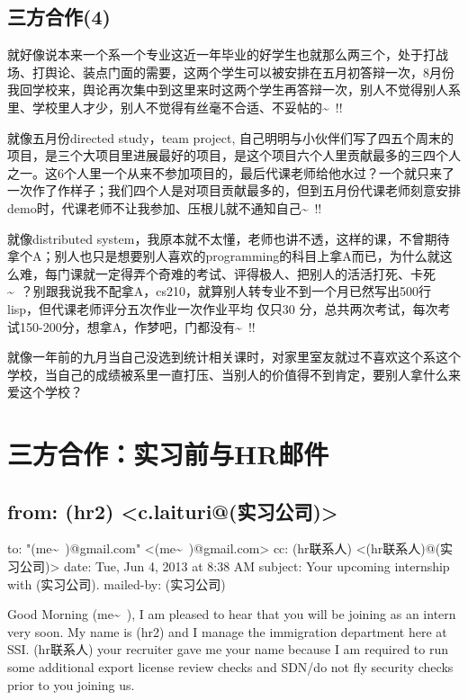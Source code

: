 \documentclass[12pt]{book}
\begin{document}
\section{三方合作(4)}
\label{sec-38-4}

就好像说本来一个系一个专业这近一年毕业的好学生也就那么两三个，处于打战场、打舆论、装点门面的需要，这两个学生可以被安排在五月初答辩一次，8月份我回学校来，舆论再次集中到这里来时这两个学生再答辩一次，别人不觉得别人系里、学校里人才少，别人不觉得有丝毫不合适、不妥帖的\textasciitilde{}~!!

就像五月份directed study，team project, 自己明明与小伙伴们写了四五个周末的项目，是三个大项目里进展最好的项目，是这个项目六个人里贡献最多的三四个人之一。这6个人里一个从来不参加项目的，最后代课老师给他水过？一个就只来了一次作了作样子；我们四个人是对项目贡献最多的，但到五月份代课老师刻意安排demo时，代课老师不让我参加、压根儿就不通知自己\textasciitilde{}~!! 

就像distributed system，我原本就不太懂，老师也讲不透，这样的课，不曾期待拿个A；别人也只是想要别人喜欢的programming的科目上拿A而已，为什么就这么难，每门课就一定得弄个奇难的考试、评得极人、把别人的活活打死、卡死\textasciitilde{}~？别跟我说我不配拿A，cs210，就算别人转专业不到一个月已然写出500行lisp，但代课老师评分五次作业一次作业平均 仅只30 分，总共两次考试，每次考试150-200分，想拿A，作梦吧，门都没有\textasciitilde{}~!!

就像一年前的九月当自己没选到统计相关课时，对家里室友就过不喜欢这个系这个学校，当自己的成绩被系里一直打压、当别人的价值得不到肯定，要别人拿什么来爱这个学校？

\chapter{三方合作：实习前与HR邮件}
\label{sec-39}

\section{from:         (hr2) <c.laituri@(实习公司)>}
\label{sec-39-1}
to:         "(me\textasciitilde{}~)@gmail.com" <(me\textasciitilde{}~)@gmail.com>
cc:         (hr联系人) <(hr联系人)@(实习公司)>
date:         Tue, Jun 4, 2013 at 8:38 AM
subject:         Your upcoming internship with (实习公司).
mailed-by:         (实习公司)

Good Morning (me\textasciitilde{}~),
I am pleased to hear that you will be joining as an intern very soon.  My name is (hr2) and I manage the immigration department here at SSI.  (hr联系人) your recruiter gave me your name because I am required to run some additional export license review checks and SDN/do not fly security checks prior to you joining us.
\end{document}
